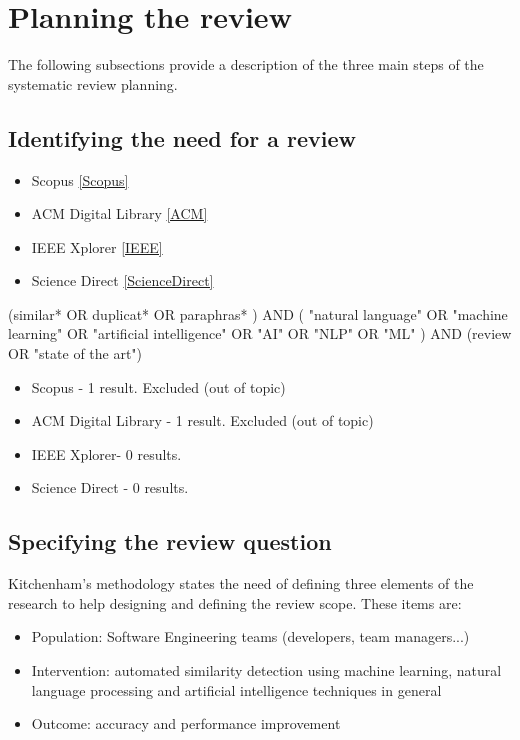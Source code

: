 \section{Planning the review}
\label{Planning}

The following subsections provide a description of the three main steps of the systematic review planning. 

\subsection{Identifying the need for a review}

\begin{itemize}
\item Scopus \ref{Scopus}
\item ACM Digital Library \ref{ACM}
\item IEEE Xplorer \ref{IEEE}
\item Science Direct \ref{ScienceDirect}
\end{itemize}

\begin{center}
(similar*  OR  duplicat*  OR  paraphras* )  AND  ( "natural language"  OR  "machine learning"  OR  "artificial intelligence"  OR  "AI" OR  "NLP"  OR  "ML" )  AND  (review  OR  "state of the art")
\end{center}

\begin{itemize}
\item Scopus - 1 result. Excluded (out of topic)
\item ACM Digital Library - 1 result. Excluded (out of topic)
\item IEEE Xplorer- 0 results.
\item Science Direct - 0 results.
\end{itemize}

\subsection{Specifying the review question}

Kitchenham's methodology states the need of defining three elements of the research to help designing and defining the review scope. These items are:

\begin{itemize}
\item Population: Software Engineering teams (developers, team managers...)
\item Intervention: automated similarity detection using machine learning, natural language processing and artificial intelligence techniques in general
\item Outcome: accuracy and performance improvement
\end{itemize}

